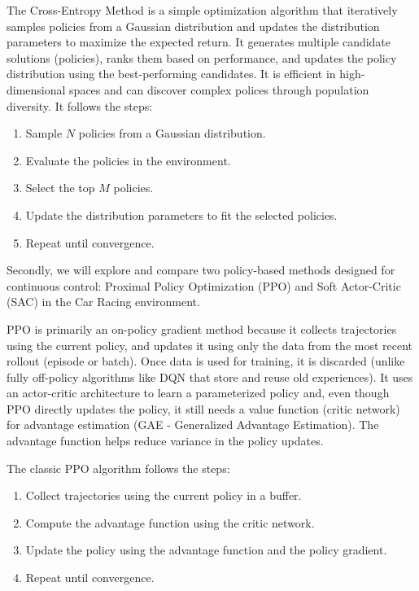 \documentclass[../CSC_52081_EP.tex]{subfiles}
\begin{document}
    The Cross-Entropy Method is a simple optimization algorithm that iteratively samples policies from a Gaussian distribution and updates the distribution parameters to maximize the expected return.
    It generates multiple candidate solutions (policies), ranks them based on performance, and updates the policy distribution using the best-performing candidates. It is efficient in high-dimensional spaces and can discover complex polices through population diversity. It follows the steps:

    \begin{enumerate}
        \item Sample $N$ policies from a Gaussian distribution.
        \item Evaluate the policies in the environment.
        \item Select the top $M$ policies.
        \item Update the distribution parameters to fit the selected policies.
        \item Repeat until convergence.
    \end{enumerate}


    Secondly, we will explore and compare two policy-based methods designed for continuous control: Proximal Policy Optimization (PPO) \cite{PPO} and Soft Actor-Critic (SAC) \cite{SAC} in the Car Racing environment.

    PPO is primarily an on-policy gradient method because it collects trajectories using the current policy, and updates it using only the data from the most recent rollout (episode or batch). Once data is used for training, it is discarded (unlike fully off-policy algorithms like DQN that store and reuse old experiences). It uses an actor-critic architecture to learn a parameterized policy and, even though PPO directly updates the policy, it still needs a value function (critic network) for advantage estimation (GAE - Generalized Advantage Estimation).
    The advantage function helps reduce variance in the policy updates.

    The classic PPO algorithm follows the steps:
    \begin{enumerate}
        \item Collect trajectories using the current policy in a buffer.
        \item Compute the advantage function using the critic network.
        \item Update the policy using the advantage function and the policy gradient.
        \item Repeat until convergence.
    \end{enumerate}
\end{document}
